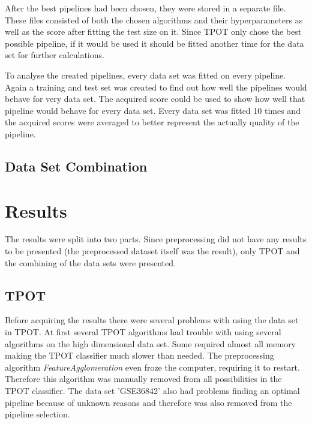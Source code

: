\documentclass[10pt,a4paper]{article}
\begin{document}
	After the best pipelines had been chosen, they were stored in a separate file. These files consisted of both the chosen algorithms and their hyperparameters as well as the score after fitting the test size on it. Since TPOT only chose the best possible pipeline, if it would be used it should be fitted another time for the data set for further calculations.
		
	To analyse the created pipelines, every data set was fitted on every pipeline. Again a training and test set was created to find out how well the pipelines would behave for very data set. The acquired score could be used to show how well that pipeline would behave for every data set. Every data set was fitted 10 times and the acquired scores were averaged to better represent the actually quality of the pipeline.
	
	\subsection{Data Set Combination}
	\label{subsec:MethodsDataSetCombination}
	
	\section{Results}
	\label{sec:Results}
	
	The results were split into two parts. Since preprocessing did not have any results to be presented (the preprocessed dataset itself was the result), only TPOT and the combining of the data sets were presented.
	
	\subsection{TPOT}
	\label{subsec:ResultsTPOT}

	Before acquiring the results there were several problems with using the data set in TPOT. At first several TPOT algorithms had trouble with using several algorithms on the high dimensional data set. Some required almost all memory making the TPOT classifier much slower than needed. The preprocessing algorithm \textit{FeatureAgglomeration} even froze the computer, requiring it to restart. Therefore this algorithm was manually removed from all possibilities in the TPOT classifier. The data set 'GSE36842' also had problems finding an optimal pipeline because of unknown reasons and therefore was also removed from the pipeline selection.
	
\end{document}
